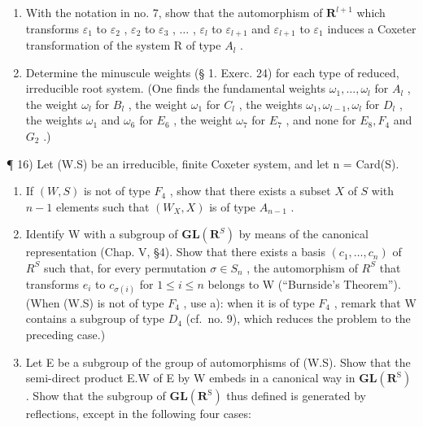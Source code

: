 \begin{enumerate}
\def\labelenumi{\arabic{enumi})}
\setcounter{enumi}{13}
\item
  With the notation in no. 7, show that the automorphism of \(\mathbf{R}^{l+1}\) which transforms \(\varepsilon_1\) to \(\varepsilon_2\) , \(\varepsilon_2\) to \(\varepsilon_3\) , \(\ldots\) , \(\varepsilon_l\) to \(\varepsilon_{l+1}\) and \(\varepsilon_{l+1}\) to \(\varepsilon_1\) induces a Coxeter transformation of the system R of type \(A_l\) .
\item
  Determine the minuscule weights (§ 1. Exerc. 24) for each type of reduced, irreducible root system. (One finds the fundamental weights \(\omega_{1},\ldots,\omega_{l}\) for \(A_{l}\) , the weight \(\omega_{l}\) for \(B_{l}\) , the weight \(\omega_{1}\) for \(C_{l}\) , the weights \(\omega_{1},\omega_{l-1},\omega_{l}\) for \(D_{l}\) , the weights \(\omega_{1}\) and \(\omega_{6}\) for \(E_{6}\) , the weight \(\omega_{7}\) for \(E_{7}\) , and none for \(E_{8},F_{4}\) and \(G_{2}\) .)
\end{enumerate}

¶ 16) Let (W.S) be an irreducible, finite Coxeter system, and let n = Card(S).

\begin{enumerate}
\def\labelenumi{\alph{enumi})}
\item
  If \((W, S)\) is not of type \(F_4\) , show that there exists a subset \(X\) of \(S\) with \(n - 1\) elements such that \((W_X, X)\) is of type \(A_{n-1}\) .
\item
  Identify W with a subgroup of \(\mathbf{GL}(\mathbf{R}^{S})\) by means of the canonical representation (Chap. V, §4). Show that there exists a basis \((c_{1},\ldots,c_{n})\) of \(R^{S}\) such that, for every permutation \(\sigma\in S_{n}\) , the automorphism of \(R^{S}\) that transforms \(e_{i}\) to \(c_{\sigma(i)}\) for \(1\leqslant i\leqslant n\) belongs to W (``Burnside's Theorem''). (When (W.S) is not of type \(F_{4}\) , use a): when it is of type \(F_{4}\) , remark that W contains a subgroup of type \(D_{4}\) (cf.~no. 9), which reduces the problem to the preceding case.)
\item
  Let E be a subgroup of the group of automorphisms of (W.S). Show that the semi-direct product E.W of E by W embeds in a canonical way in \(\mathbf{GL}(\mathbf{R}^{\mathrm{S}})\) . Show that the subgroup of \(\mathbf{GL}(\mathbf{R}^{\mathrm{S}})\) thus defined is generated by reflections, except in the following four cases:
\end{enumerate}

